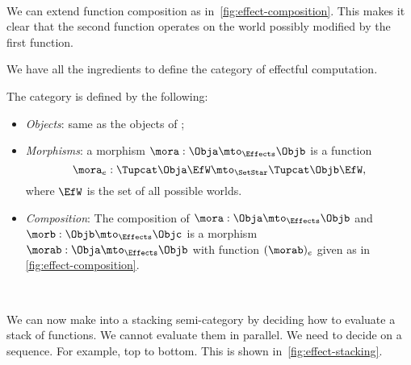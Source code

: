 \begin{marginfigure}
    \centering
    \\
    \caption{}
    \label{fig:effect-composition}
\end{marginfigure}

We can extend function composition as in~\cref{fig:effect-composition}.
This makes it clear that the second function operates on the world possibly modified by the first function.

We have all the ingredients to define the category \Effects of effectful computation.

\begin{definition}
    The \Effects category is defined by the following:
    \begin{itemize}
        \item \emph{Objects}: same as the objects of \SetStar;
        \item \emph{Morphisms}: a morphism $\mora: \Obja \mto_{\Effects} \Objb$ is a function
              \begin{equation}
                  \mora_e: \Tupcat \Obja \EfW \mto_{\SetStar} \Tupcat \Objb \EfW,
              \end{equation}
              where $\EfW$ is the set of all possible worlds.
        \item \emph{Composition}: The composition of  $\mora: \Obja \mto_{\Effects} \Objb$ and
              $\morb: \Objb \mto_{\Effects} \Objc$ is a morphism $\morab: \Obja \mto_{\Effects} \Objb$ with function $(\morab)_e$ given as in \cref{fig:effect-composition}.
    \end{itemize}
\end{definition}

\begin{marginfigure}
    \centering
    \\
    \caption{}
    \label{fig:effect-stacking}
\end{marginfigure}

We can now make \Effects into a stacking semi-category by deciding how to evaluate a stack of functions.
We cannot evaluate them in parallel.
We need to decide on a sequence.
For example, top to bottom.
This is shown in~\cref{fig:effect-stacking}.

